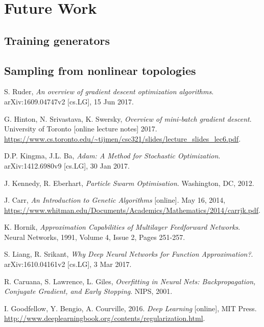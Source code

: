 \documentclass[a4paper]{article}
\begin{document}
\section{Future Work}

\subsection{Training generators}

\subsection{Sampling from nonlinear topologies}

\begin{thebibliography}{999}

  S. Ruder,
  \emph{An overview of gradient descent optimization algorithms}.
  arXiv:1609.04747v2 [cs.LG],
  15 Jun 2017.

  G. Hinton, N. Srivastava, K. Swersky,
  \emph{Overview of mini-batch gradient descent}.
  University of Toronto
  [online lecture notes]
  2017.
  \url{https://www.cs.toronto.edu/~tijmen/csc321/slides/lecture_slides_lec6.pdf}.

  D.P. Kingma, J.L. Ba,
  \emph{Adam: A Method for Stochastic Optimization}.
  arXiv:1412.6980v9 [cs.LG],
  30 Jan 2017.

  J. Kennedy, R. Eberhart,
  \emph{Particle Swarm Optimisation}.
  Washington, DC,
  2012.

  J. Carr,
  \emph{An Introduction to Genetic Algorithms}
  [online].
  May 16, 2014,
  \url{https://www.whitman.edu/Documents/Academics/Mathematics/2014/carrjk.pdf}.

  K. Hornik,
  \emph{Approximation Capabilities of Multilayer Feedforward Networks}.
  Neural Networks,
  1991,
  Volume 4,
  Issue 2,
  Pages 251-257.

  S. Liang, R. Srikant,
  \emph{Why Deep Neural Networks for Function Approximation?}.
  arXiv:1610.04161v2 [cs.LG],
  3 Mar 2017.

  R. Caruana, S. Lawrence, L. Giles,
  \emph{Overfitting in Neural Nets: Backpropagation, Conjugate Gradient, and Early Stopping}.
  NIPS,
  2001.

  I. Goodfellow, Y. Bengio, A. Courville,
  2016.
  \emph{Deep Learning}
  [online],
  MIT Press.
  \url{http://www.deeplearningbook.org/contents/regularization.html}.


\end{thebibliography}
\end{document}
